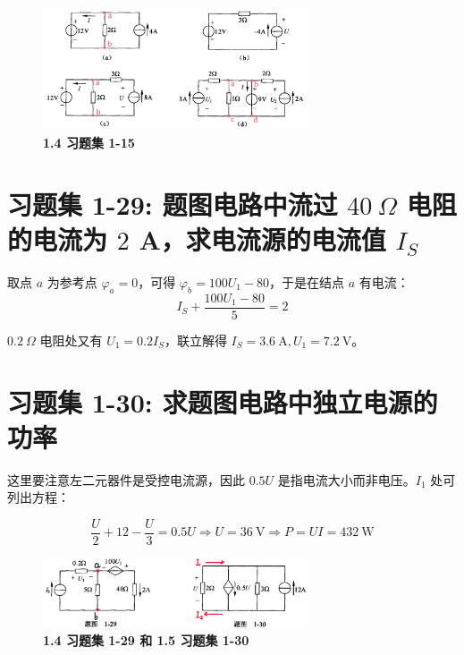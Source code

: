 \documentclass[UTF8]{report}
\theoremstyle{MyLineTheoremStyle} %
\theoremstyle{MyBlockTheoremStyle} %
\theoremstyle{MySubsubsectionStyle} %
\begin{document}
\begin{figure}[H]\centering
\includegraphics[width=0.7\textwidth]{assets/1/b82ef4f3b4efd9d0ee903e5f19353345.png}
\caption{\bfseries 1.4 习题集 1-15}
\end{figure}

\section{习题集 1-29: 题图电路中流过 $40\ \Omega$ 电阻的电流为 $2$ A，求电流源的电流值 $I_S$}

取点 $a$ 为参考点 $\varphi_a = 0$，可得 $\varphi_b = 100U_1 - 80$，于是在结点 $a$ 有电流：
\begin{equation*}
I_S + \frac{100U_1 - 80}{5} = 2
\end{equation*}

$0.2\ \Omega$ 电阻处又有 $U_1 = 0.2 I_S$，联立解得 $I_S = 3.6 \ \mathrm{A}, U_1 = 7.2 \ \mathrm{V}$。

\section{习题集 1-30: 求题图电路中独立电源的功率}

这里要注意左二元器件是受控电流源，因此 $0.5U$ 是指电流大小而非电压。$I_1$ 处可列出方程：

\begin{equation*}
\frac{U}{2} + 12 - \frac{U}{3} = 0.5U \Longrightarrow U = 36 \ \mathrm{V} \Longrightarrow P = UI = 432 \ \mathrm{W}
\end{equation*}

\begin{figure}[H]\centering
\includegraphics[width=0.7\textwidth]{assets/1/94b342032a5f6622a60b3c9d99e37993.png}
\caption{\bfseries 1.4 习题集 1-29 和 1.5 习题集 1-30}
\end{figure}
\end{document}
